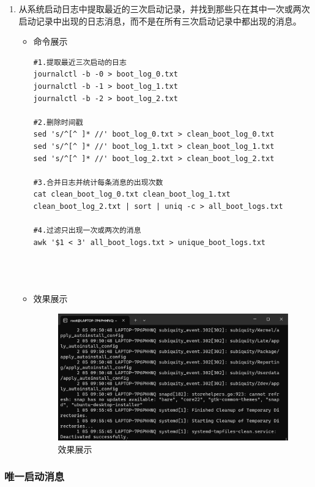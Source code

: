 \documentclass[UTF8]{ctexart}
\begin{document}
\begin{enumerate}
  \item 从系统启动日志中提取最近的三次启动记录，并找到那些只在其中一次或两次启动记录中出现的日志消息，而不是在所有三次启动记录中都出现的消息。
  \begin{itemize}
  \item 命令展示
  \begin{verbatim}
#1.提取最近三次启动的日志
journalctl -b -0 > boot_log_0.txt
journalctl -b -1 > boot_log_1.txt
journalctl -b -2 > boot_log_2.txt

#2.删除时间戳
sed 's/^[^ ]* //' boot_log_0.txt > clean_boot_log_0.txt
sed 's/^[^ ]* //' boot_log_1.txt > clean_boot_log_1.txt
sed 's/^[^ ]* //' boot_log_2.txt > clean_boot_log_2.txt

#3.合并日志并统计每条消息的出现次数
cat clean_boot_log_0.txt clean_boot_log_1.txt clean_boot_log_2.txt | sort | uniq -c > all_boot_logs.txt

#4.过滤只出现一次或两次的消息
awk '$1 < 3' all_boot_logs.txt > unique_boot_logs.txt


    
  \end{verbatim}

  \item 效果展示
  \begin{figure}[H]
    \centering
    \includegraphics[width=\textwidth]{33} %
    \caption{效果展示}
  
  \end{figure}
\end{itemize}
\end{enumerate}
\subsubsection{唯一启动消息 }
\end{document}
